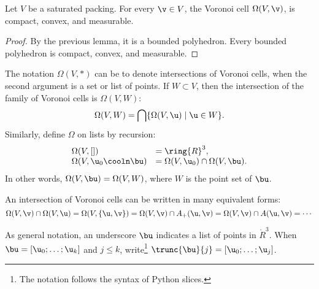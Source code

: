 \begin{lemma}
Let $ V$ be a saturated packing.  For every $\v\in  V$, 
the Voronoi cell $\Omega( V,\v)$,  is
compact, convex, and measurable.
\end{lemma}

\begin{proof}  By the previous lemma, it is a bounded polyhedron.  Every bounded
polyhedron is compact, convex, and measurable.
\end{proof}




\begin{definition}[$\Omega$]
The notation $\Omega(V,*)$ can be  to denote intersections
of Voronoi cells, when the second argument is a set or list of points.
If $W\subset V$, %
then the intersection of the family of Voronoi cells is  $\Omega(V,W)$:
\begin{displaymath}\Omega(V,W) = \bigcap \{\Omega(V, \u)\mid \u\in W
\}.\end{displaymath}
Similarly,  define $\Omega$ on lists by recursion:
\begin{displaymath}
\begin{array}{lll}
\Omega(V,[]) &= \ring{R}^3,\\
\Omega(V,\u_0\cooln\bu) &= \Omega(V,\u_0)\cap \Omega(V,\bu).\\
\end{array}
\end{displaymath}
In other words, $\Omega(V,\bu) = \Omega(V,W)$, where $W$ is the point set of $\bu$.
\end{definition}

An intersection of Voronoi cells can be written in many equivalent forms:
\begin{displaymath}
\Omega(V,\v)\cap \Omega(V,\u) =\Omega(V,\{\u,\v\})= \Omega(V,\v)\cap A_+(\u,\v) 
= \Omega(V,\v)\cap A(\u,\v) =  \cdots
\end{displaymath}


\begin{notation}[$\bu$,~$\trunc{\bu}{j}$]
As general notation, an underscore  $\bu$ indicates a list of points in $\ring{R}^3$.
%
When $\bu=[\u_0;\ldots;\u_k]$ and $j\le k$, write\footnote{The  notation follows
the syntax of Python slices.} $\trunc{\bu}{j} = 
[\u_0;\ldots;\u_j]$.  
%
\end{notation}

